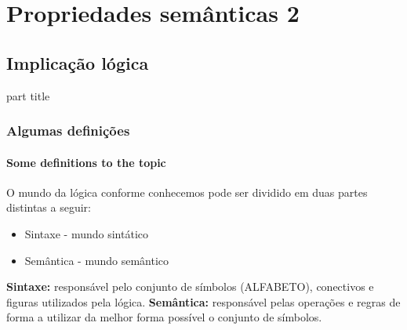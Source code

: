 \section{Propriedades semânticas 2}
%
\subsection{Implicação lógica}
%
\begin{frame}[c]
    \begin{beamercolorbox}[rounded=true,shadow=true,sep=12pt,center]{part title}
        \insertsection\par
    \end{beamercolorbox}
\end{frame}
%
\begin{frame}[t]
    \frametitle{Algumas definições}
    \framesubtitle{Some definitions to the topic}
    \begin{tcolorbox}[colback=blue!5,colframe=blue!60!black,adjusted title=Mundo lógico]
        O mundo da lógica conforme conhecemos pode ser dividido em duas partes distintas a seguir:
        \begin{itemize}
            \item Sintaxe - mundo sintático
            \item Semântica - mundo semântico
        \end{itemize}
    \end{tcolorbox}
    \begin{tcolorbox}[colback=red!5!white,colframe=red!75!black,title=Descritivo]
        \textbf{Sintaxe:} responsável pelo conjunto de símbolos (ALFABETO), conectivos e figuras utilizados pela lógica.
        \tcblower
        \textbf{Semântica:} responsável pelas operações e regras de forma a utilizar da melhor forma possível o conjunto de símbolos.
    \end{tcolorbox}
\end{frame}
%